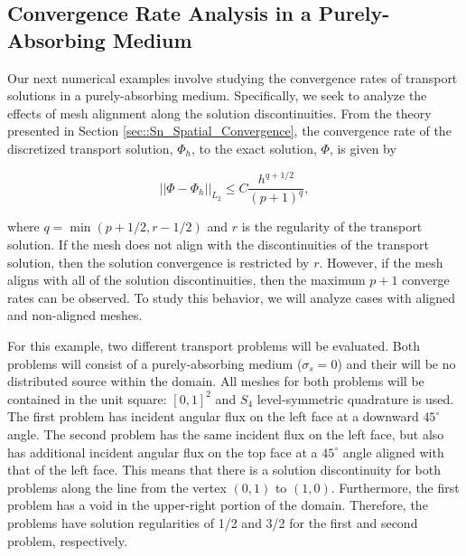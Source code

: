 


\subsection{Convergence Rate Analysis in a Purely-Absorbing Medium}
\label{sec::BF_Results_PA}

Our next numerical examples involve studying the convergence rates of transport solutions in a purely-absorbing medium. Specifically, we seek to analyze the effects of mesh alignment along the solution discontinuities. From the theory presented in Section \ref{sec::Sn_Spatial_Convergence}, the convergence rate of the discretized transport solution, $\Phi_h$, to the exact solution, $\Phi$, is given by

\begin{equation}
\label{eq::BF_results_PA_conv}
|| \Phi - \Phi_{h} ||_{L_2}\leq C \frac{h^{q+1/2}}{(p+1)^q} ,
\end{equation}

\noindent where $q = \min (p+1/2, r - 1/2)$ and $r$ is the regularity of the transport solution. If the mesh does not align with the discontinuities of the transport solution, then the solution convergence is restricted by $r$. However, if the mesh aligns with all of the solution discontinuities, then the maximum $p+1$ converge rates can be observed. To study this behavior, we will analyze cases with aligned and non-aligned meshes.

For this example, two different transport problems will be evaluated. Both problems will consist of a purely-absorbing medium ($\sigma_s=0$) and their will be no distributed source within the domain. All meshes for both problems will be contained in the unit square: $[0,1]^2$ and $S_4$ level-symmetric quadrature is used. The first problem has incident angular flux on the left face at a downward $45^{\circ}$ angle. The second problem has the same incident flux on the left face, but also has additional incident angular flux on the top face at a $45^{\circ}$ angle aligned with that of the left face. This means that there is a solution discontinuity for both problems along the line from the vertex $(0,1)$ to $(1,0)$. Furthermore, the first problem has a void in the upper-right portion of the domain. Therefore, the problems have solution regularities of 1/2 and 3/2 for the first and second problem, respectively.

